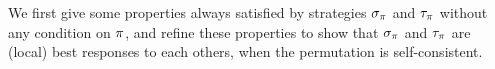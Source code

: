   






We first give some properties always satisfied by strategies
$\sigma_\pi$ and $\tau_\pi$ without any condition on $\pi$, and
refine these properties to show that $\sigma_\pi$ and $\tau_\pi$
are (local) best responses to each others, when the permutation is
self-consistent.

